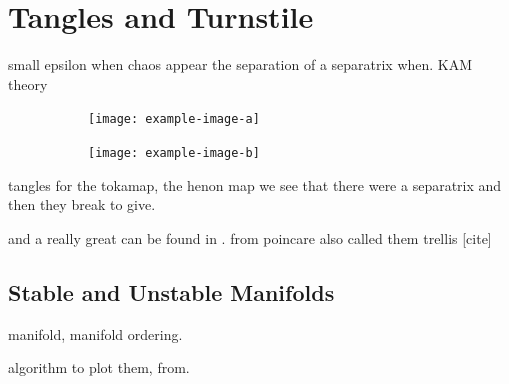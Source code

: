 \chapter{Tangles and Turnstile}

small epsilon when chaos appear the separation of a separatrix when.
KAM theory

\begin{figure}[h!]
    \centering
    \begin{subfigure}[t]{0.49\textwidth}
        \centering
        \texttt{[image: example-image-a]}
        \caption{}
        \label{fig:}
    \end{subfigure}
    \hfill
    \begin{subfigure}[t]{0.49\textwidth}
        \centering
        \texttt{[image: example-image-b]}
        \caption{}
        \label{}
    \end{subfigure}
    \caption{}
    \label{}
\end{figure}

tangles for the tokamap, the henon map
we see that there were a separatrix and then they break to give.

and a really great can be found in \cite{hohloch_homoclinic_2017}\cite{hohloch_transport_2012}.
from poincare also called them trellis [cite]

\section{Stable and Unstable Manifolds}

manifold, manifold ordering.

algorithm to plot them, from.

